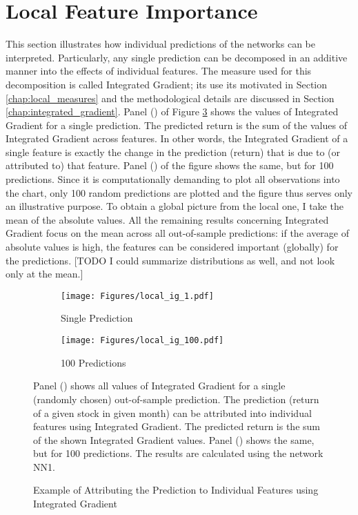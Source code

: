 \section {Local Feature Importance}

	This section illustrates how individual predictions of the networks can be interpreted. Particularly, any single prediction can be decomposed in an additive manner into the effects of individual features. The measure used for this decomposition is called Integrated Gradient; its use its motivated in Section \ref{chap:local_measures} and the methodological details are discussed in Section \ref{chap:integrated_gradient}. Panel () of Figure \ref{fig:local_ig} shows the values of Integrated Gradient for a single prediction. The predicted return is the sum of the values of Integrated Gradient across features. In other words, the Integrated Gradient of a single feature is exactly the change in the prediction (return) that is due to (or attributed to) that feature. Panel () of the figure shows the same, but for 100 predictions. Since it is computationally demanding to plot all observations into the chart, only 100 random predictions are plotted and the figure thus serves only an illustrative purpose. To obtain a global picture from the local one, I take the mean of the absolute values. All the remaining results concerning Integrated Gradient focus on the mean across all out-of-sample predictions: if the average of absolute values is high, the features can be considered important (globally) for the predictions. [TODO I could summarize distributions as well, and not look only at the mean.]

	\begin{figure}	
		\centering		
		\begin{subfigure}[t]{\textwidth}
			\texttt{[image: Figures/local\_ig\_1.pdf]}
			\caption{Single Prediction}
			\label{fig:local_ig_1}
		\end{subfigure}
		
		\begin{subfigure}[t]{\textwidth}
			\centering
			\texttt{[image: Figures/local\_ig\_100.pdf]}
			\caption{100 Predictions}
			\label{fig:local_ig_100}
		\end{subfigure}
		\caption{Example of Attributing the Prediction to Individual Features using Integrated Gradient}
		\medskip
		\small
		Panel () shows all values of Integrated Gradient for a single (randomly chosen) out-of-sample prediction. The prediction (return of a given stock in given month) can be attributed into individual features using Integrated Gradient. The predicted return is the sum of the shown Integrated Gradient values. Panel () shows the same, but for 100 predictions. The results are calculated using the network NN1.
		\label{fig:local_ig}
	\end{figure}	

